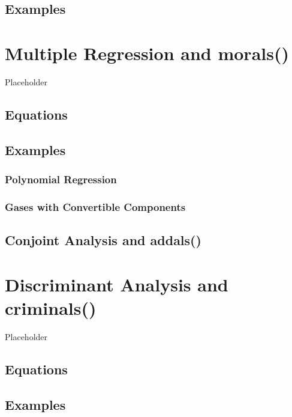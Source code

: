 \documentclass[
  12pt,
]{book}
\begin{document}
\section{Examples}\label{examples-3}

\chapter{Multiple Regression and morals()}\label{multiple-regression-and-morals}

Placeholder

\section{Equations}\label{equations-4}

\section{Examples}\label{examples-4}

\subsection{Polynomial Regression}\label{polynomial-regression}

\subsection{Gases with Convertible Components}\label{gases-with-convertible-components}

\section{Conjoint Analysis and addals()}\label{conjoint-analysis-and-addals}

\chapter{Discriminant Analysis and criminals()}\label{discriminant-analysis-and-criminals}

Placeholder

\section{Equations}\label{equations-5}

\section{Examples}\label{examples-5}
\end{document}
